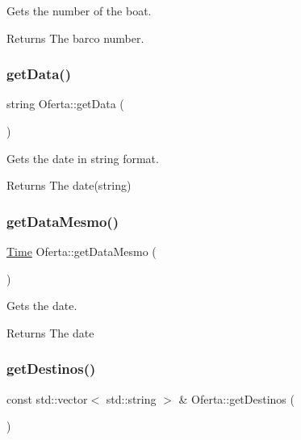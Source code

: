 Gets the number of the boat. 

\begin{DoxyReturn}{Returns}
The barco number. 
\end{DoxyReturn}
\mbox{\label{classOferta_a2b156b75371ad59af54ad96ad79c9d1e}} 
\subsubsection{\texorpdfstring{get\+Data()}{getData()}}
{\footnotesize\ttfamily string Oferta\+::get\+Data (\begin{DoxyParamCaption}{ }\end{DoxyParamCaption})}



Gets the date in string format. 

\begin{DoxyReturn}{Returns}
The date(string) 
\end{DoxyReturn}
\mbox{\label{classOferta_a13ebfcae88d39a90f0c66368534ed335}} 
\subsubsection{\texorpdfstring{get\+Data\+Mesmo()}{getDataMesmo()}}
{\footnotesize\ttfamily \hyperlink{classTime}{Time} Oferta\+::get\+Data\+Mesmo (\begin{DoxyParamCaption}{ }\end{DoxyParamCaption})\hspace{0.3cm}{\ttfamily [inline]}}



Gets the date. 

\begin{DoxyReturn}{Returns}
The date 
\end{DoxyReturn}
\mbox{\label{classOferta_a746c91e5db19098d211a3f6bde2ec8ec}} 
\subsubsection{\texorpdfstring{get\+Destinos()}{getDestinos()}}
{\footnotesize\ttfamily const std\+::vector$<$ std\+::string $>$ \& Oferta\+::get\+Destinos (\begin{DoxyParamCaption}{ }\end{DoxyParamCaption})}



